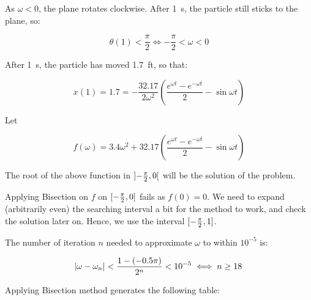 \documentclass[../../../../Assignments.tex]{subfiles}
\begin{document}
\begin{solution}
    As \(\omega < 0\), the plane rotates clockwise. After \SI{1}{\s}, the
    particle still sticks to the plane, so:

    \[\theta(1) < \frac{\pi}{2} \iff - \frac{\pi}{2} < \omega < 0\]

    After \SI{1}{\s}, the particle has moved \SI{1.7}{ft}, so that:

    \[x(1) = \num{1.7} = - \frac{\num{32.17}}{2 \omega^2} \left(\frac{e^{\omega t} - e^{- \omega t}}{2} - \sin \omega t\right)\]

    Let

    \[f(\omega) = \num{3.4} \omega^2 + \num{32.17} \left(\frac{e^{\omega t} - e^{- \omega t}}{2} - \sin \omega t\right)\]

    The root of the above function in \(\interval[open]{- \frac{\pi}{2}}{0}\) will
    be the solution of the problem.

    Applying Bisection on \(f\) on \(\interval{- \frac{\pi}{2}}{0}\) fails as
    \(f(0) = 0\). We need to expand (arbitrarily even) the searching interval a
    bit for the method to work, and check the solution later on. Hence, we use
    the interval \(\interval{- \frac{\pi}{2}}{1}\).

    The number of iteration \(n\) needed to approximate \(\omega\) to within
    \(10^{-5}\) is:

    \[\abs{\omega - \omega_n} < \frac{1 - (- \num{0.5} \pi)}{2^n} < 10^{-5} \iff n \geq 18\]

    Applying Bisection method generates the following table:


\end{solution}
\end{document}
